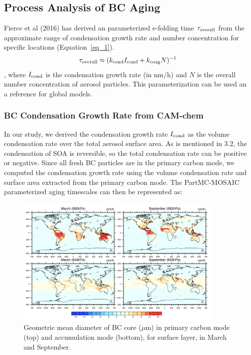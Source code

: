 \documentclass[12pt]{article}
\begin{document}
	
	\newpage
	\subsection{Process Analysis of BC Aging}
	Fierce et al (2016) has derived an parameterized e-folding time $\tau_{\rm overall}$ from the approximate range of condensation growth rate and number concentration for specific locations (Equation~\ref{eq_1}). 
	\begin{align}{\label{eq_1}}
	\tau_{\rm overall} \approx (k_{\rm cond}I_{\rm cond} + k_{\rm coag}N)^{-1}
	\end{align}, where $I_{\rm cond}$ is the condensation growth rate (in nm/h) and $N$ is the overall number concentration of aerosol particles. This parameterization can be used an a reference for global models. 
	\subsubsection{BC Condensation Growth Rate from CAM-chem}		
	In our study, we derived the condensation growth rate $I_{\rm cond}$ as the volume condensation rate over the total aerosol surface area. As is mentioned in 3.2, the condensation of SOA is reversible, so the total condensation rate can be positive or negative. Since all fresh BC particles are in the primary carbon mode, we computed the condensation growth rate using the volume condensation rate and surface area extracted from the primary carbon mode. The PartMC-MOSAIC parameterized aging timescales can then be represented as:
		\begin{figure}[H] 
			\begin{center}
				\includegraphics[width = 0.9\textwidth]{Figure24}
				\caption[]{\label{fig_p24} Geometric mean diameter of BC core ($\mu$m) in primary carbon mode (top) and accumulation mode (bottom), for surface layer, in March and September.}
			\end{center}
		\end{figure}
\end{document}
